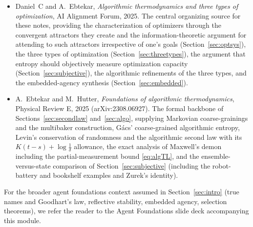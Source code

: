 \documentclass[10pt]{article}
\theoremstyle{definition}
\theoremstyle{remark}
\begin{document}
\begin{itemize}[leftmargin=2em]
  \item Daniel~C and A.~Ebtekar, \emph{Algorithmic thermodynamics and three types of optimization}, AI Alignment Forum, 2025. The central organizing source for these notes, providing the characterization of optimizers through the convergent attractors they create and the information-theoretic argument for attending to such attractors irrespective of one's goals (Section~\ref{sec:optsys}), the three types of optimization (Section~\ref{sec:threetypes}), the argument that entropy should objectively measure optimization capacity (Section~\ref{sec:subjective}), the algorithmic refinements of the three types, and the embedded-agency synthesis (Section~\ref{sec:embedded}).
  \item A.~Ebtekar and M.~Hutter, \emph{Foundations of algorithmic thermodynamics}, Physical Review E, 2025 (arXiv:2308.06927). The formal backbone of Sections~\ref{sec:secondlaw} and~\ref{sec:algo}, supplying Markovian coarse-grainings and the multibaker construction, G\'acs' coarse-grained algorithmic entropy, Levin's conservation of randomness and the algorithmic second law with its $K(t-s) + \log\frac1\delta$ allowance, the exact analysis of Maxwell's demon including the partial-measurement bound \eqref{eq:algTL}, and the ensemble-versus-state comparison of Section~\ref{sec:subjective} (including the robot-battery and bookshelf examples and Zurek's identity).
\end{itemize}

For the broader agent foundations context assumed in Section~\ref{sec:intro} (true names and Goodhart's law, reflective stability, embedded agency, selection theorems), we refer the reader to the Agent Foundations slide deck accompanying this module.
\end{document}

